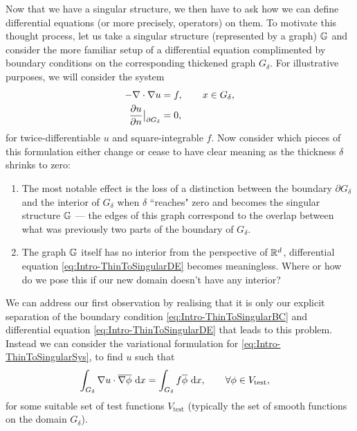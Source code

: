 Now that we have a singular structure, we then have to ask how we can define differential equations (or more precisely, operators) on them.
To motivate this thought process, let us take a singular structure (represented by a graph) $\mathbb{G}$ and consider the more familiar setup of a differential equation complimented by boundary conditions on the corresponding thickened graph $G_{\delta}$.
For illustrative purposes, we will consider the system
\begin{subequations} \label{eq:Intro-ThinToSingularSys}
	\begin{align}
		-\nabla\cdot\nabla u &= f, \qquad x\in G_{\delta}, \label{eq:Intro-ThinToSingularDE} \\
		\dfrac{\partial u}{\partial n}\big\vert_{\partial G_{\delta}} &= 0, \label{eq:Intro-ThinToSingularBC}
	\end{align}
\end{subequations}
for twice-differentiable $u$ and square-integrable $f$.
Now consider which pieces of this formulation either change or cease to have clear meaning as the thickness $\delta$ shrinks to zero:
\begin{enumerate}
	\item The most notable effect is the loss of a distinction between the boundary $\partial G_{\delta}$ and the interior of $G_{\delta}$ when $\delta$ ``reaches" zero and becomes the singular structure $\mathbb{G}$ --- the edges of this graph correspond to the overlap between what was previously two parts of the boundary of $G_{\delta}$.
	\item The graph $\mathbb{G}$ itself has no interior from the perspective of $\mathbb{R}^d$, differential equation \eqref{eq:Intro-ThinToSingularDE} becomes meaningless.
	Where or how do we pose this if our new domain doesn't have any interior?
\end{enumerate}
We can address our first observation by realising that it is only our explicit separation of the boundary condition \eqref{eq:Intro-ThinToSingularBC} and differential equation \eqref{eq:Intro-ThinToSingularDE} that leads to this problem.
Instead we can consider the variational formulation for \eqref{eq:Intro-ThinToSingularSys}, to find $u$ such that
\begin{align} \label{eq:Intro-ThinToSingularVar}
	\int_{G_{\delta}} \nabla u\cdot \overline{\nabla\phi}  \ \mathrm{d}x 
	&= \int_{G_{\delta}} f\overline{\phi}  \ \mathrm{d}x, \qquad\forall\phi\in V_{\mathrm{test}},
\end{align}
for some suitable set of test functions $V_{\mathrm{test}}$ (typically the set of smooth functions on the domain $G_{\delta}$).

